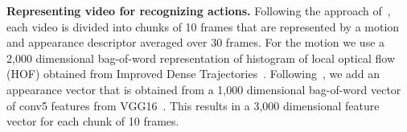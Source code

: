\noindent\textbf{Representing video for recognizing actions.}
Following the approach of~\cite{Alayrac15Unsupervised,Bojanowski14weakly,Bojanowski15weakly}, each video is divided into chunks of 10 frames that are represented by a motion and appearance descriptor averaged over 30 frames.
For the motion we use a 2,000 dimensional bag-of-word representation of histogram of local optical flow (HOF) obtained from Improved Dense Trajectories~\cite{Wang13action}.
Following~\cite{Alayrac15Unsupervised}, we add an appearance vector that is obtained from a 1,000 dimensional bag-of-word vector of conv5 features from VGG16~\cite{Simonyan14vggnets}.
This results in a 3,000 dimensional feature vector for each chunk of 10 frames.

\begin{table*}[t!]
	\centering
\end{table*}
